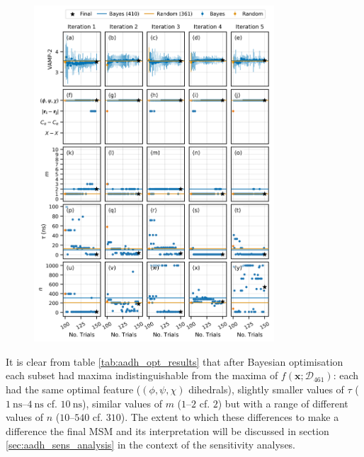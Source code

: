 \begin{figure}[p]
    \centering
    \includegraphics[width=0.8\textwidth]{chapters/msm_optimization/figures/aadh_opt_traj_act_s_d.png}
    \label{fig:aadh_opt_traj_d}
\end{figure}

 It is clear from  table \ref{tab:aadh_opt_results} that after Bayesian optimisation each subset had maxima indistinguishable from the maxima of $f(\mathbf{x};\mathcal{D}_{461})$: each had the same optimal feature ($(\phi, \psi, \chi)$ dihedrals), slightly smaller values of $\tau$ ($\SIrange{1}{4}{\nano\second}$ cf. $\SI{10}{\nano\second}$), similar values of $m$ ($\numrange{1}{2}$ cf. $2$) but with a range of different values of $n$ ($\numrange{10}{540}$ cf. $310$). The extent to which these differences to make a difference the final MSM and its interpretation will be discussed in section \ref{sec:aadh_sens_analysis} in the context of the sensitivity analyses.

